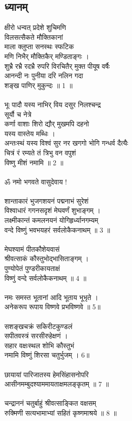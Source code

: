 \subsection{ध्यानम्}
क्षीरो धन्वत् प्रदेशे शुचिमणि \\
विलसत्सैकते मौक्तिकानां\\
माला क्लुप्ता सनस्थः स्फटिक\\
मणि निभैर् मौक्तिकैर् मण्डिताङ्गः ।\\
शुभ्रै रभ्रै रदभ्रै रुपरि विरचितैर् मुक्त पीयूष वर्षैः\\
आनन्दी नः पुनीया दरि नलिन गदा \\
शङ्ख पाणिर् मुकुन्दः ॥ 1 ॥\\
\\
भूः पादौ यस्य नाभिर् विय दसुर निलश्चन्द्र \\
सूर्यौ च नेत्रे\\
कर्णा वाशाः शिरो द्यौर् मुखमपि दहनो \\
यस्य वास्तेय मब्धिः ।\\
अन्तःस्थं यस्य विश्वं सुर नर खगगो भोगि गन्धर्व दैत्यैः\\
चित्रं रं रम्यते तं त्रिभु वन वपुशं \\
विष्णु मीशं नमामि ॥ 2 ॥\\
\\
ॐ नमो भगवते वासुदेवाय !\\
\\
शान्ताकारं भुजगशयनं पद्मनाभं सुरेशं\\
विश्वाधारं गगनसदृशं मेघवर्णं शुभाङ्गम् ।\\
लक्ष्मीकान्तं कमलनयनं योगिहृर्ध्यानगम्यम्\\
वन्दे विष्णुं भवभयहरं सर्वलोकैकनाथम् ॥ 3 ॥\\
\\
मेघश्यामं पीतकौशेयवासं\\
श्रीवत्साकं कौस्तुभोद्भासिताङ्गम् ।\\
पुण्योपेतं पुण्डरीकायताक्षं\\
विष्णुं वन्दे सर्वलोकैकनाथम् ॥ 4 ॥\\
\\
नमः समस्त भूतानां आदि भूताय भूभृते ।\\
अनेकरूप रूपाय विष्णवे प्रभविष्णवे ॥ 5॥\\
\\
सशङ्खचक्रं सकिरीटकुण्डलं\\
सपीतवस्त्रं सरसीरुहेक्षणं ।\\
सहार वक्षःस्थल शोभि कौस्तुभं\\
नमामि विष्णुं शिरसा चतुर्भुजम् । 6॥\\
\\
छायायां पारिजातस्य हेमसिंहासनोपरि\\
आसीनमम्बुदश्याममायताक्षमलङ्कृतम् ॥ 7 ॥\\
\\
चन्द्राननं चतुर्बाहुं श्रीवत्साङ्कित वक्षसम्\\
रुक्मिणी सत्यभामाभ्यां सहितं कृष्णमाश्रये ॥ 8 ॥\\
